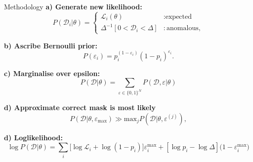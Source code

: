 \documentclass{beamer}
\begin{document}
  \begin{frame}{Methodology}
    \footnotesize
    \textbf{a) Generate new likelihood:}
    \begin{equation}
        P(\mathcal{D}_i|\theta) = \begin{cases}
            \mathcal{L}_i(\theta) &: \text{expected}\\
            \Delta^{-1}[ 0<\mathcal{D}_i<\Delta] &: \text{anomalous},
        \end{cases}
    \end{equation}

    \textbf{b) Ascribe Bernoulli prior:}
    \begin{equation}
        P(\varepsilon_i) = p_i^{(1-\varepsilon_i)}(1-p_i)^{\varepsilon_i}.
    \end{equation}

    \textbf{c) Marginalise over epsilon:}
    \begin{equation}
        P(\mathcal{D} | \theta) =\sum_{\varepsilon \in \{ 0, 1 \} ^N}P(\mathcal{D},\varepsilon|\theta)
      \end{equation}


      \textbf{d) Approximate correct mask is most likely}
       \begin{equation}
 P(\mathcal{D}|\theta, \varepsilon_{\mathrm{max}}) \gg \mathrm{max}_j P(\mathcal{D}|\theta,\varepsilon^{(j)})\label{eq:nlo},
\end{equation}

    \textbf{d) Loglikelihood:}
    \begin{equation}
        \log{P(\mathcal{D}|\theta)} = \sum_{i}[{\log{\mathcal{L}_i}+\log({1-p_i})]\varepsilon^{\mathrm{max}}_i + [\log{p}_i - \log{\Delta}](1 - \varepsilon^\mathrm{max}_i})
    \end{equation}
  \end{frame}
\end{document}
